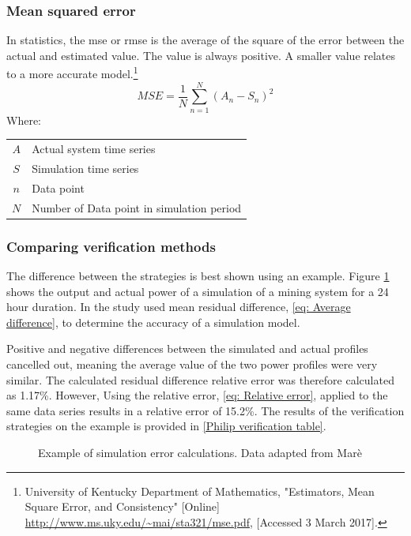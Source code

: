  		\subsubsection{Mean squared error}	
 		In statistics, the \gls{mse} or \gls{rmse} is the average of the square of the error between the actual and estimated value. The value is always positive. A smaller value relates to a more accurate model.\footnote{University of Kentucky Department of Mathematics, "Estimators, Mean Square Error, and
 			Consistency" [Online] \url{http://www.ms.uky.edu/~mai/sta321/mse.pdf}, [Accessed 3 March 2017].}
 			\begin{equation}
 				\label{eq: rmse}
 				MSE = \dfrac{1}{N}\sum_{n=1}^{N}{(A_{n} - S_{n})^2}
 			\end{equation}
 			Where: \par
 			\begin{table}[h!]
 				\centering
 				\begin{tabular}{cl}
 					$A$ & Actual system time series \\
 					$S$ & Simulation time series \\
 					$n$ & Data point \\
 					$N$ & Number of Data point in simulation period \\
 			\end{tabular} 
 			\end{table}	
 		\subsubsection{Comparing verification methods}
 		The difference between the strategies is best shown using an example. Figure \cref{fig:Philipp Difference verify} shows the output and actual power of a simulation of a mining system for a 24 hour duration. In the study \cite{Mare2016PhD} used mean residual difference, \cref{eq: Average difference}, to determine the accuracy of a simulation model.
 		\par 
 		 Positive and negative differences between the simulated and actual profiles cancelled out, meaning the average value of the two power profiles were very similar. The calculated residual difference relative error was therefore calculated as 1.17\%. However, Using the relative error, \cref{eq: Relative error}, applied to the same data series results in a relative error of 15.2\%. The results of the verification strategies on the example is provided in \cref{Philip verification table}. 
 		
 	\begin{figure}[h!]
 		\centering
 		
 		\caption[Example of simulation error calculations.]{Example of simulation error calculations. Data adapted from Marè \cite{Mare2016PhD}}
 		\label{fig:Philipp Difference verify}
 	\end{figure}
 
